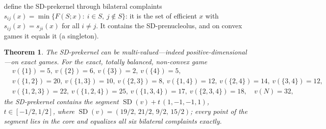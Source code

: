 \documentclass[11pt]{article}
\newtheorem{theorem}{Theorem}[section]
\newcommand{\SD}{\operatorname{SD}}
\begin{document}
\citet{ArinKatsev2016b,ArinKatsev2018} define the SD-prekernel
through bilateral complaints
$s_{ij}(x)=\min\{F(S;x):\ i\in S,\ j\notin S\}$: it is the set of efficient
$x$ with $s_{ij}(x)=s_{ji}(x)$ for all $i\neq j$. It contains the
SD-prenucleolus, and on convex games it equals it (a singleton).

\begin{theorem}\label{thm:sdpk}
The SD-prekernel can be multi-valued---indeed positive-dimensional---on
exact games. For the exact, totally balanced, non-convex game
\[
\begin{aligned}
&v(\{1\})=5,\ v(\{2\})=6,\ v(\{3\})=2,\ v(\{4\})=5,\\
&v(\{1,2\})=20,\ v(\{1,3\})=10,\ v(\{2,3\})=8,\ v(\{1,4\})=12,\
 v(\{2,4\})=14,\ v(\{3,4\})=12,\\
&v(\{1,2,3\})=22,\ v(\{1,2,4\})=25,\ v(\{1,3,4\})=17,\ v(\{2,3,4\})=18,\quad
 v(N)=32,
\end{aligned}
\]
the SD-prekernel contains the segment
$\SD(v)+t\,(1,-1,-1,1)$, $t\in[-1/2,1/2]$, where
$\SD(v)=(19/2,\,21/2,\,9/2,\,15/2)$; every point of the segment lies in the
core and equalizes all six bilateral complaints exactly.
\end{theorem}
\end{document}
